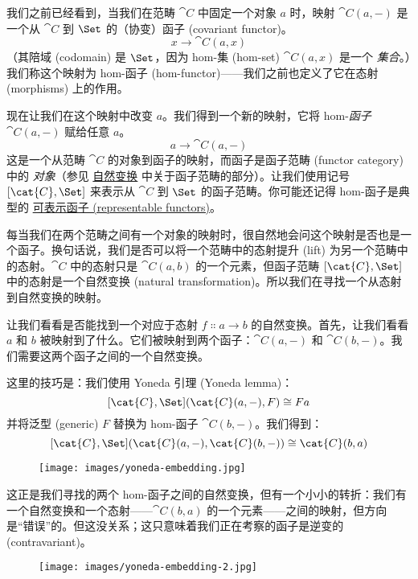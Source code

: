 
\lettrine[lhang=0.17]{我}{们之前已经看到}，当我们在范畴 $\cat{C}$ 中固定一个对象 $a$ 时，映射 $\cat{C}(a, -)$ 是一个从 $\cat{C}$ 到 $\Set$ 的（协变）函子 (covariant functor)。
\[x \to \cat{C}(a, x)\]
（其陪域 (codomain) 是 $\Set$，因为 hom-集 (hom-set) $\cat{C}(a, x)$ 是一个 \emph{集合}。）我们称这个映射为 hom-函子 (hom-functor)——我们之前也定义了它在态射 (morphisms) 上的作用。

现在让我们在这个映射中改变 $a$。我们得到一个新的映射，它将 hom-\emph{函子} $\cat{C}(a, -)$ 赋给任意 $a$。
\[a \to \cat{C}(a, -)\]
这是一个从范畴 $\cat{C}$ 的对象到函子的映射，而函子是函子范畴 (functor category) 中的 \emph{对象}（参见 \hyperref[natural-transformations]{自然变换} 中关于函子范畴的部分）。让我们使用记号 $[\cat{C}, \Set]$ 来表示从 $\cat{C}$ 到 $\Set$ 的函子范畴。你可能还记得 hom-函子是典型的 \hyperref[representable-functors]{可表示函子 (representable functors)}。

每当我们在两个范畴之间有一个对象的映射时，很自然地会问这个映射是否也是一个函子。换句话说，我们是否可以将一个范畴中的态射提升 (lift) 为另一个范畴中的态射。$\cat{C}$ 中的态射只是 $\cat{C}(a, b)$ 的一个元素，但函子范畴 $[\cat{C}, \Set]$ 中的态射是一个自然变换 (natural transformation)。所以我们在寻找一个从态射到自然变换的映射。

让我们看看是否能找到一个对应于态射 $f \Colon a \to b$ 的自然变换。首先，让我们看看 $a$ 和 $b$ 被映射到了什么。它们被映射到两个函子：$\cat{C}(a, -)$ 和 $\cat{C}(b, -)$。我们需要这两个函子之间的一个自然变换。

这里的技巧是：我们使用 Yoneda 引理 (Yoneda lemma)：
\[[\cat{C}, \Set](\cat{C}(a, -), F) \cong F a\]
并将泛型 (generic) $F$ 替换为 hom-函子 $\cat{C}(b, -)$。我们得到：
\[[\cat{C}, \Set](\cat{C}(a, -), \cat{C}(b, -)) \cong \cat{C}(b, a)\]
\begin{figure}[H]
  \centering
  \texttt{[image: images/yoneda-embedding.jpg]}
\end{figure}

\noindent
这正是我们寻找的两个 hom-函子之间的自然变换，但有一个小小的转折：我们有一个自然变换和一个态射——$\cat{C}(b, a)$ 的一个元素——之间的映射，但方向是“错误”的。但这没关系；这只意味着我们正在考察的函子是逆变的 (contravariant)。

\begin{figure}[H]
  \centering
  \texttt{[image: images/yoneda-embedding-2.jpg]}
\end{figure}

